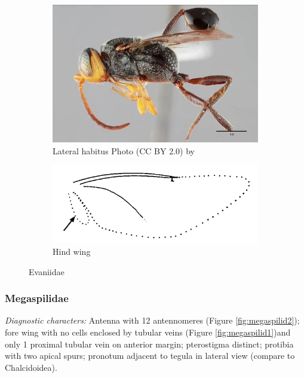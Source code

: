 \documentclass[letterpaper, 11pt]{article}
\begin{document}
\begin{figure}[ht!]
  \centering
\begin{subfigure}[ht!]{0.45\textwidth}
    \includegraphics[width=\textwidth]{EvaniidHabitus}
  \caption{Lateral habitus Photo (CC BY 2.0) by \cite{MullinsEtAl2012}}
  \label{fig:evaniid1}
\end{subfigure}
    \hfill
\begin{subfigure}[ht!]{0.45\textwidth}
    \includegraphics[width=\textwidth]{EvaniidWing}
  \caption{Hind wing \citep[][pg. 510]{goulet1993hymenoptera}}
  \label{fig:evaniid2}
\end{subfigure}
    \caption{Evaniidae}
    \label{fig:evaniid}
\end{figure}

\subsubsection{Megaspilidae}
\noindent{}\textit{Diagnostic characters:} Antenna with 12 antennomeres (Figure \ref{fig:megaspilid2}); fore wing with no cells enclosed by tubular veins (Figure \ref{fig:megaspilid1})and only 1 proximal tubular vein on anterior margin; pterostigma distinct; protibia with two apical spurs; pronotum adjacent to tegula in lateral view (compare to Chalcidoidea).\\
\end{document}
